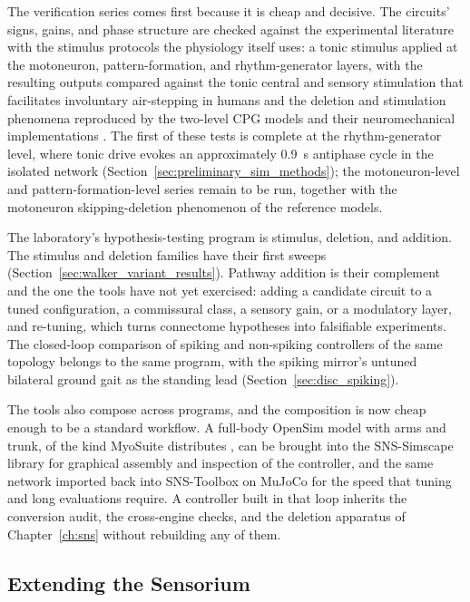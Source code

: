 The verification series comes first because it is cheap and decisive. The circuits' signs, gains, and phase structure are checked against the experimental literature with the stimulus protocols the physiology itself uses: a tonic stimulus applied at the motoneuron, pattern-formation, and rhythm-generator layers, with the resulting outputs compared against the tonic central and sensory stimulation that facilitates involuntary air-stepping in humans \citep{selionov_tonic_2009} and the deletion and stimulation phenomena reproduced by the two-level CPG models and their neuromechanical implementations \citep{rybak_modelling_2006, markin_afferent_2010, shevtsova_modeling_2016}. The first of these tests is complete at the rhythm-generator level, where tonic drive evokes an approximately \qty{0.9}{\second} antiphase cycle in the isolated network (Section~\ref{sec:preliminary_sim_methods}); the motoneuron-level and pattern-formation-level series remain to be run, together with the motoneuron skipping-deletion phenomenon of the reference models.

The laboratory's hypothesis-testing program is stimulus, deletion, and addition. The stimulus and deletion families have their first sweeps (Section~\ref{sec:walker_variant_results}). Pathway addition is their complement and the one the tools have not yet exercised: adding a candidate circuit to a tuned configuration, a commissural class, a sensory gain, or a modulatory layer, and re-tuning, which turns connectome hypotheses into falsifiable experiments. The closed-loop comparison of spiking and non-spiking controllers of the same topology belongs to the same program, with the spiking mirror's untuned bilateral ground gait as the standing lead (Section~\ref{sec:disc_spiking}).

The tools also compose across programs, and the composition is now cheap enough to be a standard workflow. A full-body OpenSim model with arms and trunk, of the kind MyoSuite distributes \citep{caggiano_myosuite_2022}, can be brought into the SNS-Simscape library for graphical assembly and inspection of the controller, and the same network imported back into SNS-Toolbox on MuJoCo \citep{nourse_sns_2023} for the speed that tuning and long evaluations require. A controller built in that loop inherits the conversion audit, the cross-engine checks, and the deletion apparatus of Chapter~\ref{ch:sns} without rebuilding any of them.

\subsection{Extending the Sensorium}\label{sec:fw_senses}

